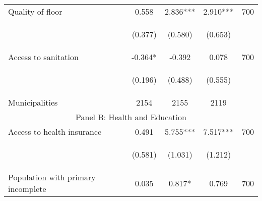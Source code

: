 \begin{tabular}{lcccc}
Quality of floor          		  &  0.558    &    2.836***   &     2.910***  &  700 \\

\vspace{4pt} &  \begin{footnotesize}(0.377)\end{footnotesize}   &
			    \begin{footnotesize}(0.580)\end{footnotesize}   &
			    \begin{footnotesize}(0.653)\end{footnotesize}   &
			     \\          


Access to sanitation          		  &  -0.364*    &   -0.392    &     0.078  &  700  \\

\vspace{4pt} &  \begin{footnotesize}(0.196)\end{footnotesize}   &
			    \begin{footnotesize}(0.488)\end{footnotesize}   &
			    \begin{footnotesize}(0.555)\end{footnotesize}   &
			     \\          

Municipalities  &   2154   &    2155     &  2119      \\

\hline		
\multicolumn{5}{c}{Panel B: Health and Education}   \\                                                          


Access to health insurance      &  0.491    &    5.755***   &     7.517***  &  700    \\

\vspace{4pt} &  \begin{footnotesize}(0.581)\end{footnotesize}   &
			    \begin{footnotesize}(1.031)\end{footnotesize}   &
			    \begin{footnotesize}(1.212)\end{footnotesize}   &
			     \\          


Population with primary incomplete  &  0.035    &    0.817*   &     0.769  &  700  \\


\end{tabular}
